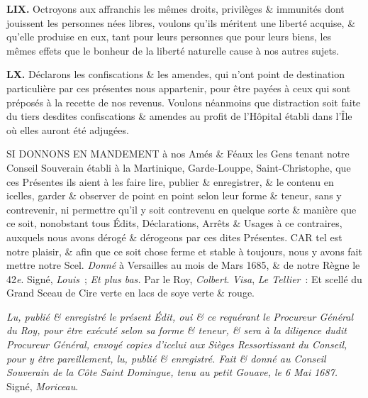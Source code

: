\documentclass[french,twoside]{book} %
\newif\ifdev
\renewcommand{\LettrineFontHook}{\color{rubric}}
\newcommand{\initialiv}[2]{%
  \let\oldLFH\LettrineFontHook
  \IfSubStr{QJ’}{#1}{
    \lettrine[lines=4, lhang=0.2, loversize=-0.1, lraise=0.2]{\smash{#1}}{#2}
  }{\IfSubStr{É}{#1}{
    \lettrine[lines=4, lhang=0.2, loversize=-0, lraise=0]{\smash{#1}}{#2}
  }{\IfSubStr{ÀÂ}{#1}{
    \lettrine[lines=4, lhang=0.2, loversize=-0, lraise=0, slope=0.6em]{\smash{#1}}{#2}
  }{\IfSubStr{A}{#1}{
    \lettrine[lines=4, lhang=0.2, loversize=0.2, slope=0.6em]{\smash{#1}}{#2}
  }{\IfSubStr{V}{#1}{
    \lettrine[lines=4, lhang=0.2, loversize=0.2, slope=-0.5em]{\smash{#1}}{#2}
  }{
    \lettrine[lines=4, lhang=0.2, loversize=0.2]{\smash{#1}}{#2}
  }}}}}
  \let\LettrineFontHook\oldLFH
}
\newcommand{\labelchar}[1]{\textbf{\color{rubric} #1}}
\renewcommand{\LettrineFontHook}{\bfseries\color{rubric}}
\begin{document}
\labelchar{LIX.} Octroyons aux affranchis les mêmes droits, privilèges \& immunités dont jouissent les personnes nées libres, voulons qu’ils méritent une liberté acquise, \& qu’elle produise en eux, tant pour leurs personnes que pour leurs biens, les mêmes effets que le bonheur de la liberté naturelle cause à nos autres sujets.\par
\labelchar{LX.} Déclarons les confiscations \& les amendes, qui n’ont point de destination particulière par ces présentes nous appartenir, pour être payées à ceux qui sont préposés à la recette de nos revenus. Voulons néanmoins que distraction soit faite du tiers desdites confiscations \& amendes au profit de l’Hôpital établi dans l’Île où elles auront été adjugées.\par
SI DONNONS EN MANDEMENT à nos Amés \& Féaux les Gens tenant notre Conseil Souverain établi à la Martinique, Garde-Louppe, Saint-Christophe, que ces Présentes ils aient à les faire lire, publier \& enregistrer, \& le contenu en icelles, garder \& observer de point en point selon leur forme \& teneur, sans y contrevenir, ni permettre qu’il y soit contrevenu en quelque sorte \& manière que ce soit, nonobstant tous Édits, Déclarations, Arrêts \& Usages à ce contraires, auxquels nous avons dérogé \& dérogeons par ces dites Présentes. CAR tel est notre plaisir, \& afin que ce soit chose ferme et stable à toujours, nous y avons fait mettre notre Scel. \emph{Donné} à Versailles au mois de Mars 1685, \& de notre Règne le 42\emph{e}. Signé, \emph{Louis} ; \emph{Et plus bas.} Par le Roy, \emph{Colbert}. \emph{Visa}, \emph{Le Tellier} : Et scellé du Grand Sceau de Cire verte en lacs de soye verte \& rouge.\par
\emph{Lu, publié \& enregistré le présent Édit, oui \& ce requérant le Procureur Général du Roy, pour être exécuté selon sa forme \& teneur, \& sera à la diligence dudit Procureur Général, envoyé copies d’icelui aux Sièges Ressortissant du Conseil, pour y être pareillement, lu, publié \& enregistré. Fait \& donné au Conseil Souverain de la Côte Saint Domingue, tenu au petit Gouave, le 6 Mai 1687.} Signé, \emph{Moriceau}.
 


\ifbooklet
  \newpage\null\thispagestyle{empty}\newpage
\fi

\ifdev %
\fontname\font — \textsc{Les règles du jeu}\par
(\hyperref[utopie]{\underline{Lien}})\par
\noindent \initialiv{A}{lors là}\blindtext\par
\noindent \initialiv{À}{ la bonheur des dames}\blindtext\par
\noindent \initialiv{É}{tonnez-le}\blindtext\par
\noindent \initialiv{Q}{ualitativement}\blindtext\par
\noindent \initialiv{V}{aloriser}\blindtext\par
\Blindtext
\phantomsection
\label{utopie}
\Blinddocument
\fi
\end{document}
